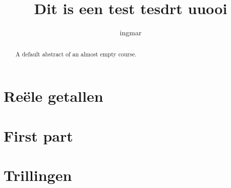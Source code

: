 \documentclass{xourse}
\title{Dit is een test tesdrt uuooi}
\author{ingmar}
\begin{document}
\begin{abstract}
    A default abstract of an almost empty course.
\end{abstract}
\maketitle

\part{Reële getallen}

\part{First part}


\part{Trillingen}
\end{document}
